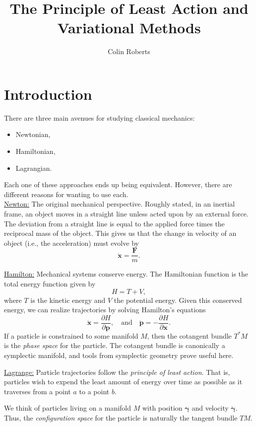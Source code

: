\documentclass[12pt]{article}
\title{The Principle of Least Action and Variational Methods}
\author{Colin Roberts}
\newcommand{\position}{\boldsymbol{\gamma}}
\newcommand{\velocity}{\boldsymbol{\dot{\gamma}}}
\theoremstyle{definition}
\newcounter{ex}[section]\setcounter{ex}{0}
\begin{document}
\maketitle

\setcounter{section}{-1}
\section{Introduction}
There are three main avenues for studying classical mechanics:
\begin{itemize}
    \item Newtonian,
    \item Hamiltonian,
    \item Lagrangian.
\end{itemize}
Each one of these approaches ends up being equivalent.  However, there are different reasons for wanting to use each.\\

\noindent \underline{Newton:} The original mechanical perspective.  Roughly stated, in an inertial frame, an object moves in a straight line unless acted upon by an external force. The deviation from a straight line is equal to the applied force times the reciprocal mass of the object. This gives us that the change in velocity of an object (i.e., the acceleration) must evolve by
\[
\mathbf{\ddot{x}} = \frac{\mathbf{F}}{m}.
\]

\noindent \underline{Hamilton:} Mechanical systems conserve energy.  The Hamiltonian function is the total energy function given by
\[
H=T+V,
\]
where $T$ is the kinetic energy and $V$ the potential energy.  Given this conserved energy, we can realize trajectories by solving Hamilton's equations
\[
\mathbf{\dot{x}}=\frac{\partial H}{\partial \mathbf{p}}, \quad \textrm{and} \quad \mathbf{\dot{p}} = -\frac{\partial H}{\partial \mathbf{x}}.
\]
If a particle is constrained to some manifold $M$, then the cotangent bundle $T^*M$ is the \emph{phase space} for the particle. The cotangent bundle is canonically a symplectic manifold, and tools from symplectic geometry prove useful here.

\noindent \underline{Lagrange:} Particle trajectories follow the \emph{principle of least action}. That is, particles wish to expend the least amount of energy over time as possible as it traverses from a point $a$ to a point $b$. 

We think of particles living on a manifold $M$ with position $\position$ and velocity $\velocity$.  Thus, the \emph{configuration space} for the particle is naturally the tangent bundle $TM$.  
\end{document}
